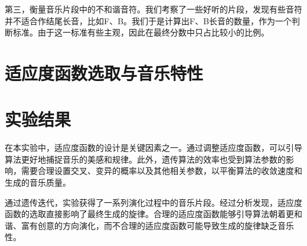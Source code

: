 \documentclass{article}
\begin{document}
第三，衡量音乐片段中的不和谐音符。我们考察了一些好听的片段，发现有些音符并不适合作结尾长音，比如F、B。我们于是计算出F、B长音的数量，作为一个判断标准。由于这一标准有些主观，因此在最终分数中只占比较小的比例。

\section{适应度函数选取与音乐特性}



\section{实验结果}
在本实验中，适应度函数的设计是关键因素之一。通过调整适应度函数，可以引导算法更好地捕捉音乐的美感和规律。此外，遗传算法的效率也受到算法参数的影响，需要合理设置交叉、变异的概率以及其他相关参数，以平衡算法的收敛速度和生成的音乐质量。


通过遗传迭代，实验获得了一系列演化过程中的音乐片段。经过分析发现，适应度函数的选取直接影响了最终生成的旋律。合理的适应度函数能够引导算法朝着更和谐、富有创意的方向演化，而不合理的适应度函数可能导致生成的旋律缺乏音乐性。
\end{document}
